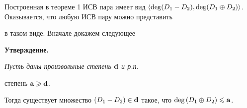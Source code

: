 Построенная в теореме 1 ИСВ пара имеет вид $\langle \deg\draz,


\deg\dsum\rangle$. Оказывается, что любую ИСВ пару можно представить


в таком виде. Вначале докажем следующее


\medskip







{\bf Утверждение. }{\it Пусть даны произвольные \pp степень ${\bold d}$ и р.п.


степень ${\bold a}\geqslant{\bold d}$.


Тогда существует \pp множество $\draz\in\dg{d}$ такое, что $\deg{\dsum}\mer


\dg{a}$.}







